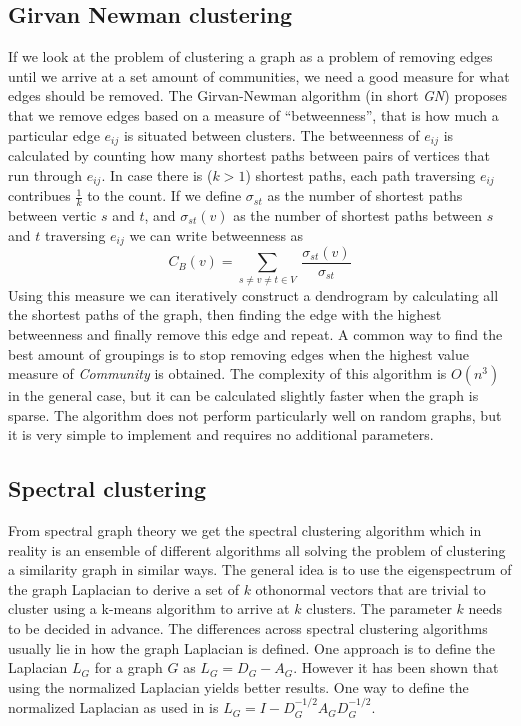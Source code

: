 \subsection{Girvan Newman clustering}
If we look at the problem of clustering a graph as a problem of removing 
edges until we arrive at a set amount of communities, we need a good 
measure for what edges should be removed. The Girvan-Newman algorithm 
(in short \emph{GN}) proposes that we remove edges based on a measure of 
``betweenness'', that is how much a particular edge $e_{ij}$ is situated 
between clusters. The betweenness of $e_{ij}$ is calculated by counting 
how many shortest paths between pairs of vertices that run through 
$e_{ij}$. In case there is ($k > 1$) shortest paths, each path 
traversing $e_{ij}$ contribues $\frac{1}{k}$ to the count.  If we define 
$\sigma_{st}$ as the number of shortest paths between vertic $s$ and 
$t$, and $\sigma_{st}(v)$ as the number of shortest paths between $s$ 
and $t$ traversing $e_{ij}$ we can write betweenness as
\begin{equation}
	C_B(v)= \sum_{s \neq v \neq t \in V} \
	\frac{\sigma_{st}(v)}{\sigma_{st}}
\end{equation}
Using this measure we can iteratively construct a dendrogram by 
calculating all the shortest paths of the graph, then finding the edge 
with the highest betweenness and finally remove this edge and repeat. A 
common way to find the best amount of groupings is to stop removing 
edges when the highest value measure of \emph{Community} is obtained.
The complexity of this algorithm is $O(n^3)$ in the general case, but it
can be calculated slightly faster when the graph is sparse. The 
algorithm does not perform particularly well on random graphs, but it is 
very simple to implement and requires no additional parameters.



\subsection{Spectral clustering}
From spectral graph theory we get the spectral clustering algorithm 
which in reality is an ensemble of different algorithms all solving the 
problem of clustering a similarity graph in similar ways. The general 
idea is to use the eigenspectrum of the graph Laplacian to derive a set 
of $k$ othonormal vectors that are trivial to cluster using a k-means 
algorithm to arrive at $k$ clusters\cite{von2007}. The parameter $k$ 
needs to be decided in advance. The differences across spectral 
clustering algorithms usually lie in how the graph Laplacian is defined.  
One approach is to define the Laplacian $L_G$ for a graph $G$ as $L_G = 
D_G - A_G$. However it has been shown that using the normalized 
Laplacian yields better results.  One way to define the normalized 
Laplacian as used in \cite{ng2002} is $L_G = I - D_{G}^{-1/2} A_G 
D_{G}^{-1/2}$.

